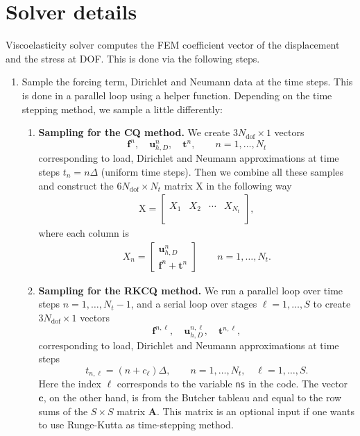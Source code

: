 \documentclass[12pt,english]{article}
\numberwithin{equation}{section}
\newcommand{\Ndof}{N_{\mathrm{dof}}}
\newcommand{\mb}{\mathbf}
\newcommand{\mr}{\mathrm}
\begin{document}
\section{Solver details}
Viscoelasticity solver computes the FEM coefficient vector of the displacement and the stress at DOF. This is done via the following steps.
\begin{enumerate}
\item
Sample the forcing term, Dirichlet and Neumann data at the time steps. This is done in a parallel loop using a helper function. Depending on the time stepping method, we sample a little differently:
\begin{enumerate}
\item
	\textbf{Sampling for the CQ method.} We create $3\Ndof \times 1$ vectors 
			\[
				\mb f^n, \quad \mb u^n_{h,D}, \quad \mb t^n, \qquad n=1,\ldots,N_t
			\]
		corresponding to load, Dirichlet and Neumann approximations at time steps $t_n = n \Delta$ (uniform time steps). Then we combine all these samples and construct the $6 \Ndof \times N_t$ matrix $\mr X$ in the following way
		\begin{align*}
		\mr X = \left[ \begin{array}{c|c|c|c}
			&	 & 		& 	\\
		X_1  & X_2 & \cdots & X_{N_t}\\
			&	 & 		& 	\\		
		\end{array} \right],
		\end{align*}
	where each column is
		\begin{align*}
			X_n = \left[ \begin{array}{c}
			\mb u^n_{h,D} \\[1em]
			\mb f^n + \mb t^n
			\end{array} \right ] \qquad n = 1, \ldots, N_t.
		\end{align*}
\item
	\textbf{Sampling for the RKCQ method.} We run a parallel loop over time steps $n=1,\ldots,N_t - 1$, and a serial loop over stages $\ell = 1,\ldots, S$ to create $3\Ndof \times 1$ vectors
			\[
				\mb f^{n,\ell}, \quad \mb u^{n,\ell}_{h,D}, \quad \mb t^{n,\ell},
			\]
		corresponding to load, Dirichlet and Neumann approximations at time steps 
			\[
				 t_{n,\ell} = (n  +  c_\ell) \Delta, \qquad n = 1,\ldots,N_t, \quad \ell = 1,\ldots,S.
			\]
		Here the index $\ell$ corresponds to the variable {\tt ns} in the code. The vector $\mb c$, on the other hand, is from the Butcher tableau and equal to the row sums of the $S \times S$ matrix $\mathbf A$. This matrix is an optional input if one wants to use Runge-Kutta as  time-stepping method.
		

\end{enumerate}
\end{enumerate}
\end{document}
